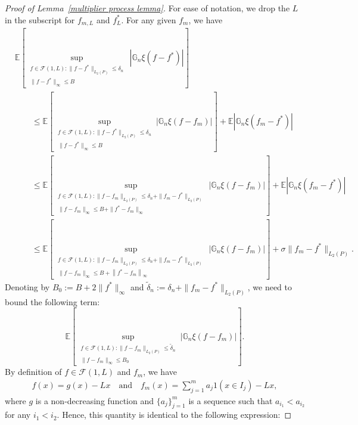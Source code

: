 \documentclass[12pt]{article}
\begin{document}
\begin{appendices}
\begin{proof}[Proof of Lemma~\ref{multiplier process lemma}]
For ease of notation, we drop the $L$ in the subscript for $f_{m,L}$ and $f^*_{L}$. For any given $f_m$, we have
\begin{equation}
\label{transform the supremum}
\begin{aligned}
&\mathbb{E} \left[\sup _{\substack{f \in \mathcal{F}(1, L):\|f-f^*\|_{L_2(P)} \leq \delta_n \\\|f-f^*\|_{\infty} \leq B}}\, \left|\mathbb{G}_n \xi(f-f^*)\right|\right]\\
&\qquad \leq \mathbb{E} \left[\sup _{\substack{f \in \mathcal{F}(1, L):\|f-f^*\|_{L_2(P)} \leq \delta_n \\\|f-f^*\|_{\infty} \leq B}}\left|\mathbb{G}_n \xi(f-f_m)\right|\right]+\mathbb{E}\left|\mathbb{G}_n\xi(f_m-f^*)\right|\\
& \qquad\leq \mathbb{E} \left[
\sup _{\substack{f \in \mathcal{F}(1, L):\|f-f_m\|_{L_2(P)} \leq \delta_n+\|f_m-f^*\|_{L_2(P)} \\\|f-f_m\|_{\infty} \leq B+\|f^* - f_m\|_{\infty}}}
\left|\mathbb{G}_n \xi(f-f_m)\right|\right]+\mathbb{E}\left|\mathbb{G}_n \xi(f_m-f^*)\right|\\
& \qquad\leq \mathbb{E} \left[
\sup _{\substack{f \in \mathcal{F}(1, L):\|f-f_m\|_{L_2(P)} \leq \delta_n+\|f_m-f^*\|_{L_2(P)} \\\|f-f_m\|_{\infty} \leq B+\left\|f^* - f_m\right\|_{\infty}}}
\left|\mathbb{G}_n \xi(f-f_m)\right|\right]+\sigma\|f_m - f^*\|_{L_2(P)}.
\end{aligned}
\end{equation}
Denoting by $B_0 := B + 2\|f^*\|_{\infty}$ and $\tilde\delta_n := \delta_n + \|f_m - f^*\|_{L_2(P)}$, we need to bound the following term:
\begin{equation}\nonumber
 \mathbb{E}\left[ 
\sup _{\substack{f \in \mathcal{F}(1, L):\|f-f_m\|_{L_2(P)} \leq \tilde\delta_n
\\\|f-f_m\|_{\infty} \leq B_0}}
\left|\mathbb{G}_n \xi(f-f_m)\right|\right].
\end{equation}
By definition of $f \in \mathcal{F}(1, L)$ and $f_m$, we have
\begin{align}
	f(x) = g(x)-Lx\quad\textrm{and}\quad f_m(x) = \sum_{j=1}^m a_j1(x\in I_j)-Lx\nonumber,
\end{align}
where $g$ is a non-decreasing function and $\{a_j\}_{j=1}^m$ is a sequence such that $a_{i_1} < a_{i_2}$ for any $i_1 < i_2$. Hence, this quantity is identical to the following expression:

\end{proof}
\end{appendices}
\end{document}
